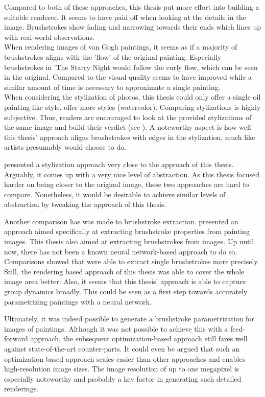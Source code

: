 Compared to both of these approaches, this thesis put more effort into building a suitable renderer.
It seems to have paid off when looking at the details in the image.
Brushstrokes show fading and narrowing towards their ends which lines up with real-world observations.\\
When rendering images of van Gogh paintings, it seems as if a majority of brushstrokes aligns with the 'flow' of the original painting.
Especially brushstrokes in 'The Starry Night would follow the curly flow, which can be seen in the original.
Compared to \citeauthor*{LpaintB} the visual quality seems to have improved while a similar amount of time is necessary to approximate a single painting.\\
When considering the stylization of photos, this thesis could only offer a single oil painting-like style.
\citeauthor*{LpaintB} offer more styles (\eg watercolor).
Comparing stylizations is highly subjective.
Thus, readers are encouraged to look at the provided stylizations of the same image and build their verdict (see ).
A noteworthy aspect is how well this thesis' approach aligns brushstrokes with edges in the stylization, much like artists presumably would choose to do.

\citeauthor*{neuralpainters} presented a stylization approach very close to the approach of this thesis.
Arguably, it comes up with a very nice level of abstraction.
As this thesis focused harder on being closer to the original image, these two approaches are hard to compare.
Nonetheless, it would be desirable to achieve similar levels of abstraction by tweaking the approach of this thesis.


Another comparison has was made to brushstroke extraction.
\citeauthor*{lamberti} presented an approach aimed specifically at extracting brushstroke properties from painting images.
This thesis also aimed at extracting brushstrokes from images.
Up until now, there has not been a known neural network-based approach to do so.
Comparisons showed that \citeauthor*{lamberti} were able to extract single brushstrokes more precisely.
Still, the rendering based approach of this thesis was able to cover the whole image area better.
Also, it seems that this thesis' approach is able to capture group dynamics broadly.
This could be seen as a first step towards accurately parametrizing paintings with a neural network.


Ultimately, it was indeed possible to generate a brushstroke parametrization for images of paintings.
Although it was not possible to achieve this with a feed-forward approach, the subsequent optimization-based approach still fares well against state-of-the-art counter-parts.
It could even be argued that such an optimization-based approach scales easier than other approaches and enables high-resolution image sizes.
The image resolution of up to one megapixel is especially noteworthy and probably a key factor in generating such detailed renderings.

